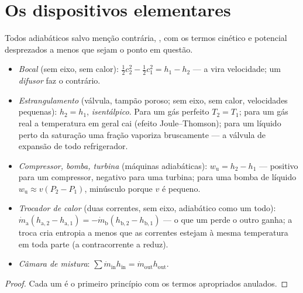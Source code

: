 \section{Os dispositivos elementares}

\begin{proposition}\label{prop:b2:open-systems:devices}
Todos adiabáticos salvo menção contrária, , com os termos cinético e potencial
desprezados a menos que sejam o ponto em questão.
\begin{itemize}
\item \emph{Bocal} (sem eixo, sem calor): $\tfrac12c_2^2 -
      \tfrac12c_1^2 = h_1 - h_2$ --- a  vira velocidade; um
      \emph{difusor} faz o contrário.
\item \emph{Estrangulamento} (válvula, tampão poroso; sem eixo,
      sem calor, velocidades pequenas): $h_2 = h_1$, \emph{isentálpico}. Para um
      gás perfeito $T_2 = T_1$; para um gás real a temperatura em geral
      cai (efeito Joule--Thomson); para um líquido perto da saturação uma
      fração vaporiza bruscamente --- a válvula de expansão de todo
      refrigerador.
\item \emph{Compressor, bomba, turbina} (máquinas
      adiabáticas): $w_{\text{u}} = h_2 - h_1$ --- positivo para um compressor,
      negativo para uma turbina; para uma bomba de líquido $w_{\text{u}} \approx
      v(P_2 - P_1)$, minúsculo porque $v$ é pequeno.
\item \emph{Trocador de calor} (duas correntes, sem
      eixo, adiabático como um todo): $\dot m_{\text{a}}(h_{\text{a},2} -
      h_{\text{a},1}) = -\dot m_{\text{b}}(h_{\text{b},2} - h_{\text{b},1})$
      --- o que um perde o outro ganha; a troca cria entropia
      a menos que as correntes estejam à mesma temperatura em toda parte
      (a contracorrente a reduz).
\item \emph{Câmara de mistura}: $\sum\dot m_{\text{in}}h_{\text{in}} = \dot
      m_{\text{out}}h_{\text{out}}$.
\end{itemize}
\end{proposition}

\begin{proof}
Cada um é o primeiro princípio com os termos apropriados anulados.
\end{proof}

